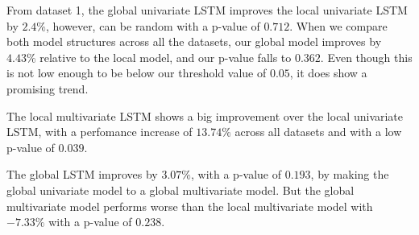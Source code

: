 From dataset 1, the global univariate LSTM improves the local univariate
LSTM by $2.4\%$, however, can be random with a p-value of $0.712$.
When we compare both model structures across all the datasets,
our global model improves by $4.43\%$ relative to the local model,
and our p-value falls to $0.362$. Even though this is not low enough
to be below our threshold value of $0.05$, it does show a promising trend.


The local multivariate LSTM shows a big improvement over the local univariate LSTM,
with a perfomance increase of $13.74\%$ across all datasets and with a
low p-value of $0.039$.

The global LSTM improves by $3.07\%$, with a p-value of $0.193$, by making the global univariate model to a global multivariate model.
But the global multivariate model performs worse than the local multivariate model with $-7.33\%$ with a p-value of $0.238$.


%
%
%
%
%
%
%
%
%